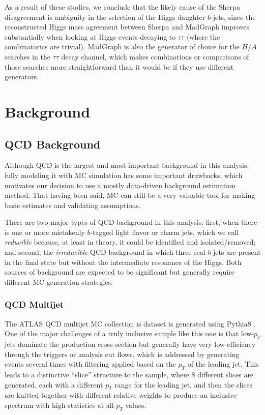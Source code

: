 As a result of these studies, we conclude that the likely cause of the Sherpa 
disagreement is ambiguity in the selection of the Higgs daughter $b$-jets, since
the reconstructed Higgs mass agreement between Sherpa and MadGraph improves substantially when looking
at Higgs events decaying to $\tau\tau$ (where the combinatorics are trivial).
MadGraph is also the generator of choice for the $H/A$ searches in the $\tau\tau$ 
decay channel, which makes combinations or comparisons of those searches
more straightforward than it would be if they use different generators.

\section{Background}
\subsection{QCD Background}
Although QCD is the largest and most important background in this analysis, fully modeling 
it with MC simulation has some important drawbacks, which motivates our decision to use a 
mostly data-driven background estimation method.  That having been said, MC can 
still be a very valuable tool for making basic estimates and validating assumptions. 

There are two major types of QCD background in this analysis: first, when 
there is one or more mistakenly $b$-tagged light flavor or charm jets, 
which we call \textit{reducible} because, at least in theory, 
it could be identified and isolated/removed; and second, the \textit{irreducible} 
QCD background in which three real $b$-jets are present in the final 
state but without the intermediate resonance of the Higgs.  Both sources of background are 
expected to be significant but generally require different MC generation strategies.



\subsubsection{QCD Multijet}
The ATLAS QCD multijet MC collection is dataset is generated using Pythia8 \cite{Pythia8}.  
One of the major challenges of a truly inclusive sample like this one is that 
low-$p_T$ jets dominate the production cross section but generally have 
very low efficiency through the triggers or analysis cut flows, which is addressed by 
generating events several times with filtering applied based on the $p_T$ 
of the leading jet.  This leads to a distinctive ``slice'' structure to 
the sample, where 8 different slices are generated, each with a different $p_T$ 
range for the leading jet, and then the slices are knitted together with different 
relative weights to produce an inclusive spectrum with high statistics at all $p_T$ values.  

